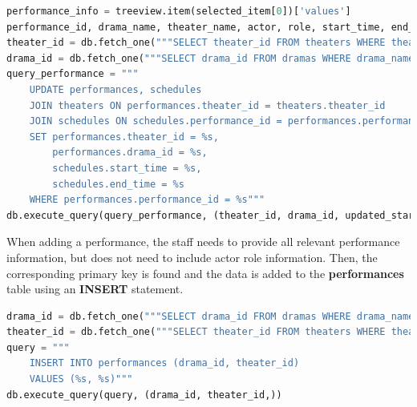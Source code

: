 \documentclass[12pt]{article}
\begin{document}
\begin{tcolorbox}[colframe=black, colback=white, boxrule=0.4mm, sharp corners=southwest, title=Excerpt of Performance Edit Code]
    \begin{lstlisting}[language=Python, breaklines=true]
performance_info = treeview.item(selected_item[0])['values']
performance_id, drama_name, theater_name, actor, role, start_time, end_time = performance_info
theater_id = db.fetch_one("""SELECT theater_id FROM theaters WHERE theater_name=%s""", (updated_theater_name,))[0]
drama_id = db.fetch_one("""SELECT drama_id FROM dramas WHERE drama_name=%s""", (updated_drama_name,))[0]
query_performance = """
    UPDATE performances, schedules
    JOIN theaters ON performances.theater_id = theaters.theater_id
    JOIN schedules ON schedules.performance_id = performances.performance_id
    SET performances.theater_id = %s,
        performances.drama_id = %s,
        schedules.start_time = %s,
        schedules.end_time = %s
    WHERE performances.performance_id = %s"""
db.execute_query(query_performance, (theater_id, drama_id, updated_start_time, updated_end_time, performance_id))
\end{lstlisting}
\end{tcolorbox}

\par When adding a performance, the staff needs to provide all relevant performance information, but does not need to include actor role information. Then, the corresponding primary key is found and the data is added to the \textbf{performances} table using an \textbf{INSERT} statement.
\begin{tcolorbox}[colframe=black, colback=white, boxrule=0.4mm, sharp corners=southwest, title=Excerpt of Performance Add Code]
    \begin{lstlisting}[language=Python, breaklines=true]
drama_id = db.fetch_one("""SELECT drama_id FROM dramas WHERE drama_name=%s""", (drama_name,))[0]
theater_id = db.fetch_one("""SELECT theater_id FROM theaters WHERE theater_name=%s""",(theater_name))[0]
query = """
    INSERT INTO performances (drama_id, theater_id)
    VALUES (%s, %s)"""
db.execute_query(query, (drama_id, theater_id,))
\end{lstlisting}
\end{tcolorbox}
\end{document}

